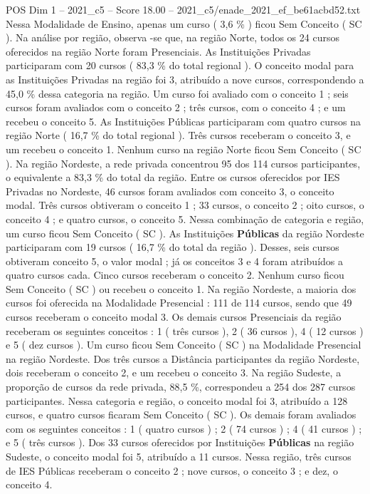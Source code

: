 \begin{textsample}{POS Dim 1 – 2021\_c5 – Score 18.00 – 2021\_c5/enade\_2021\_ef\_be61acbd52.txt}
Nessa Modalidade de Ensino, apenas um curso ( 3,6 \% ) ficou Sem Conceito ( SC ).
Na análise por região, observa -se que, na região Norte, todos os 24 cursos oferecidos na região Norte foram Presenciais.
As Instituições Privadas participaram com 20 cursos ( 83,3 \% do total regional ).
O conceito modal para as Instituições Privadas na região foi 3, atribuído a nove cursos, correspondendo a 45,0 \% dessa categoria na região.
Um curso foi avaliado com o conceito 1 ; seis cursos foram avaliados com o conceito 2 ; três cursos, com o conceito 4 ; e um recebeu o conceito 5.
As Instituições Públicas participaram com quatro cursos na região Norte ( 16,7 \% do total regional ).
Três cursos receberam o conceito 3, e um recebeu o conceito 1.
Nenhum curso na região Norte ficou Sem Conceito ( SC ).
Na região Nordeste, a rede privada concentrou 95 dos 114 cursos participantes, o equivalente a 83,3 \% do total da região.
Entre os cursos oferecidos por IES Privadas no Nordeste, 46 cursos foram avaliados com conceito 3, o conceito modal.
Três cursos obtiveram o conceito 1 ; 33 cursos, o conceito 2 ; oito cursos, o conceito 4 ; e quatro cursos, o conceito 5.
Nessa combinação de categoria e região, um curso ficou Sem Conceito ( SC ).
As Instituições \textbf{Públicas} da região Nordeste participaram com 19 cursos ( 16,7 \% do total da região ).
Desses, seis cursos obtiveram conceito 5, o valor modal ; já os conceitos 3 e 4 foram atribuídos a quatro cursos cada.
Cinco cursos receberam o conceito 2.
Nenhum curso ficou Sem Conceito ( SC ) ou recebeu o conceito 1.
Na região Nordeste, a maioria dos cursos foi oferecida na Modalidade Presencial : 111 de 114 cursos, sendo que 49 cursos receberam o conceito modal 3.
Os demais cursos Presenciais da região receberam os seguintes conceitos : 1 ( três cursos ), 2 ( 36 cursos ), 4 ( 12 cursos ) e 5 ( dez cursos ).
Um curso ficou Sem Conceito ( SC ) na Modalidade Presencial na região Nordeste.
Dos três cursos a Distância participantes da região Nordeste, dois receberam o conceito 2, e um recebeu o conceito 3.
Na região Sudeste, a proporção de cursos da rede privada, 88,5 \%, correspondeu a 254 dos 287 cursos participantes.
Nessa categoria e região, o conceito modal foi 3, atribuído a 128 cursos, e quatro cursos ficaram Sem Conceito ( SC ).
Os demais foram avaliados com os seguintes conceitos : 1 ( quatro cursos ) ; 2 ( 74 cursos ) ; 4 ( 41 cursos ) ; e 5 ( três cursos ).
Dos 33 cursos oferecidos por Instituições \textbf{Públicas} na região Sudeste, o conceito modal foi 5, atribuído a 11 cursos.
Nessa região, três cursos de IES Públicas receberam o conceito 2 ; nove cursos, o conceito 3 ; e dez, o conceito 4.

\end{textsample}
